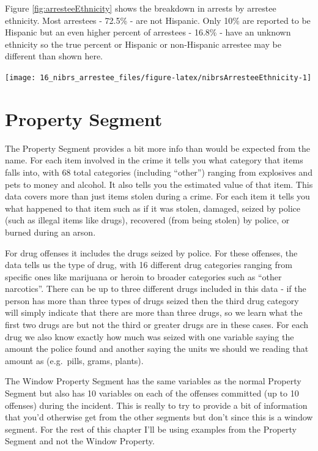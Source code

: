 \documentclass[
]{krantz}
\let\origfigure\figure
\let\endorigfigure\endfigure
\renewenvironment{figure}[1][2] {
    \expandafter\origfigure\expandafter[H]
} {
    \endorigfigure
}
\begin{document}
Figure \ref{fig:arresteeEthnicity} shows the breakdown in
arrests by arrestee ethnicity. Most arrestees - 72.5\% - are
not Hispanic. Only 10\% are reported to be Hispanic but an
even higher percent of arrestees - 16.8\% - have an unknown
ethnicity so the true percent or Hispanic or non-Hispanic
arrestee may be different than shown here.

\begin{figure}

{\centering \texttt{[image: 16\_nibrs\_arrestee\_files/figure-latex/nibrsArresteeEthnicity-1]} 

}

\caption{The share of arrestees by ethnicity, 1991-2022.}\label{fig:nibrsArresteeEthnicity}
\end{figure}

\chapter{Property Segment}\label{property}

The Property Segment provides a bit more info than would be
expected from the name. For each item involved in the crime
it tells you what category that items falls into, with 68
total categories (including ``other'') ranging from
explosives and pets to money and alcohol. It also tells you
the estimated value of that item. This data covers more than
just items stolen during a crime. For each item it tells you
what happened to that item such as if it was stolen,
damaged, seized by police (such as illegal items like
drugs), recovered (from being stolen) by police, or burned
during an arson.

For drug offenses it includes the drugs seized by police.
For these offenses, the data tells us the type of drug, with
16 different drug categories ranging from specific ones like
marijuana or heroin to broader categories such as ``other
narcotics''. There can be up to three different drugs
included in this data - if the person has more than three
types of drugs seized then the third drug category will
simply indicate that there are more than three drugs, so we
learn what the first two drugs are but not the third or
greater drugs are in these cases. For each drug we also know
exactly how much was seized with one variable saying the
amount the police found and another saying the units we
should we reading that amount as (e.g.~pills, grams,
plants).

The Window Property Segment has the same variables as the
normal Property Segment but also has 10 variables on each of
the offenses committed (up to 10 offenses) during the
incident. This is really to try to provide a bit of
information that you'd otherwise get from the other segments
but don't since this is a window segment. For the rest of
this chapter I'll be using examples from the Property
Segment and not the Window Property.
\end{document}
